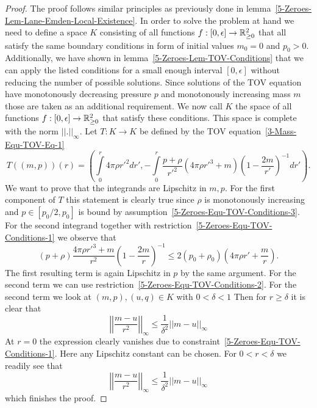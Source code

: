 \begin{proof}
	The proof follows similar principles as previously done in lemma~\ref{5-Zeroes-Lem-Lane-Emden-Local-Existence}.
	In order to solve the problem at hand we need to define a space $K$ consisting of all functions $f:[0,\epsilon]\rightarrow\mathbb{R}_{\geq0}^2$ that all satisfy the same boundary conditions in form of initial values $m_0=0$ and $p_0>0$.
	Additionally, we have shown in lemma~\ref{5-Zeroes-Lem-TOV-Conditions} that we can apply the listed conditions for a small enough interval $[0,\epsilon]$ without reducing the number of possible solutions.
	Since solutions of the \ac{TOV} equation have monotonously decreasing pressure $p$ and monotonously increasing mass $m$ those are taken as an additional requirement.
	We now call $K$ the space of all functions $f:[0,\epsilon]\rightarrow\mathbb{R}_{\geq0}^2$ that satisfy these conditions.
	This space is complete with the norm $||.||_\infty$.
	Let $T:K\rightarrow K$ be defined by the \ac{TOV} equation~\eqref{3-Mass-Equ-TOV-Eq-1}
	\[
		T((m,p))(r)=\left(\int\limits_0^r 4\pi\rho r'^2 dr',-\int\limits_0^r\frac{p+\rho}{r'^2}(4\pi\rho r'^3 + m)\left(1-\frac{2m}{r'}\right)^{-1}dr'\right).
	\]
	We want to prove that the integrands are Lipschitz in $m,p$.
	For the first component of $T$ this statement is clearly true since $\rho$ is monotonously increasing and $p\in[p_0/2,p_0]$ is bound by assumption~\eqref{5-Zeroes-Equ-TOV-Conditions-3}.
	For the second integrand together with restriction~\eqref{5-Zeroes-Equ-TOV-Conditions-1} we observe that
	\[
		(p+\rho)\frac{4\pi\rho r'^3+m}{r^2}\left(1-\frac{2 m}{r}\right)^{-1} \leq2(p_0+\rho_0)\left(4\pi\rho r'+\frac{m}{r}\right).
	\]
	The first resulting term is again Lipschitz in $p$ by the same argument.
	For the second term we can use restriction~\eqref{5-Zeroes-Equ-TOV-Conditions-2}.
	For the second term we look at $(m,p),(u,q)\in K$ with $0<\delta<1$
	Then for $r\geq\delta$ it is clear that
	\[
		\left|\left|\frac{m-u}{r^2}\right|\right|_{\infty}\leq\frac{1}{\delta^2}\left|\left|m-u\right|\right|_{\infty}
	\]
	At $r=0$ the expression clearly vanishes due to constraint~\eqref{5-Zeroes-Equ-TOV-Conditions-1}.
	Here any Lipschitz constant can be chosen.
	For $0<r<\delta$ we readily see that
	\[
		\left|\left|\frac{m-u}{r^2}\right|\right|_{\infty}\leq\frac{1}{\delta^2}\left|\left|m-u\right|\right|_{\infty}
	\]
	which finishes the proof.
\end{proof}
